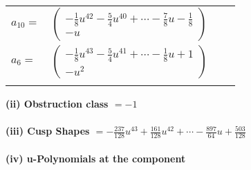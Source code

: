 \documentclass[1p]{elsarticle_modified}
\theoremstyle{definition}
\begin{document}
\begin{tabular}{m{7pt} m{180pt} m{7pt} m{180pt} }
\flushright $a_{10}=$&$\begin{pmatrix}-\frac{1}{8} u^{42}-\frac{5}{4} u^{40}+\cdots-\frac{7}{8} u-\frac{1}{8}\\- u\end{pmatrix}$ \\
\flushright $a_{6}=$&$\begin{pmatrix}-\frac{1}{8} u^{43}-\frac{5}{4} u^{41}+\cdots-\frac{1}{8} u+1\\- u^2\end{pmatrix}$\\&\end{tabular}
\flushleft \textbf{(ii) Obstruction class $= -1$}\\~\\
\flushleft \textbf{(iii) Cusp Shapes $= -\frac{237}{128} u^{43}+\frac{161}{128} u^{42}+\cdots-\frac{897}{64} u+\frac{503}{128}$}\\~\\
\newpage\renewcommand{\arraystretch}{1}
\flushleft \textbf{(iv) u-Polynomials at the component}\newline \\
\end{document}
